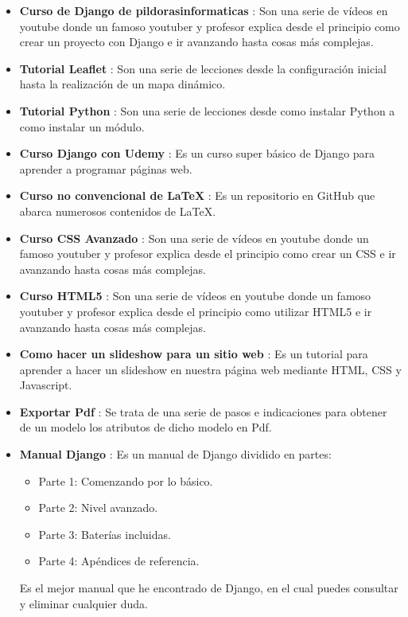 \begin{itemize}
	\item \textbf{Curso de Django de pildorasinformaticas} \cite{djangoPildoras}: Son una serie de vídeos en youtube donde un famoso youtuber y profesor explica desde el principio como crear un proyecto con Django e ir avanzando hasta cosas más complejas.
	\item \textbf{Tutorial Leaflet} \cite{tutorialLeaflet}: Son una serie de lecciones desde la configuración inicial hasta la realización de un mapa dinámico. 
	\item \textbf{Tutorial Python} \cite{tutorialPython}: Son una serie de lecciones desde como instalar Python a como instalar un módulo. 
	\item \textbf{Curso Django con Udemy} \cite{udemy}: Es un curso super básico de Django para aprender a programar páginas web.
	\item \textbf{Curso no convencional de LaTeX} \cite{cursoLatex}: Es un repositorio en GitHub que abarca numerosos contenidos de LaTeX. 
	\item \textbf{Curso CSS Avanzado} \cite{cursoCss}: Son una serie de vídeos en youtube donde un famoso youtuber y profesor explica desde el principio como crear un CSS e ir avanzando hasta cosas más complejas.
	\item \textbf{Curso HTML5} \cite{cursoHTML}: Son una serie de vídeos en youtube donde un famoso youtuber y profesor explica desde el principio como utilizar HTML5 e ir avanzando hasta cosas más complejas.
	\item \textbf{Como hacer un slideshow para un sitio web} \cite{slideshow}: Es un tutorial para aprender a hacer un slideshow en nuestra página web mediante HTML, CSS y Javascript.
	\item \textbf{Exportar Pdf} \cite{exportarPdf}: Se trata de una serie de pasos e indicaciones para obtener de un modelo los atributos de dicho modelo en Pdf.
	\item \textbf{Manual Django} \cite{manualDjango}: Es un manual de Django dividido en partes:
	\begin{itemize} 
		\item Parte 1: Comenzando por lo básico.
		\item Parte 2: Nivel avanzado.
		\item Parte 3: Baterías incluidas.
		\item Parte 4: Apéndices de referencia.
	\end{itemize}
	Es el mejor manual que he encontrado de Django, en el cual puedes consultar y eliminar cualquier duda.


\end{itemize}
